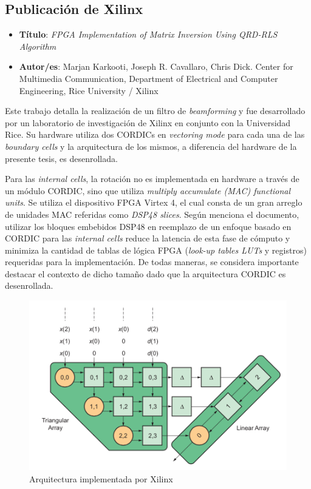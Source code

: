 \subsection{Publicación de Xilinx}

\begin{itemize}
\item[] \textbf{Título}: \textit{FPGA Implementation of Matrix Inversion Using QRD-RLS Algorithm} 
\item[] \textbf{Autor/es}: Marjan Karkooti, Joseph R. Cavallaro, Chris Dick. Center for Multimedia Communication, Department of Electrical and Computer Engineering, Rice University / Xilinx
\end{itemize}

Este trabajo \cite{XilinxQR} detalla la realización de un filtro de \textit{beamforming} y fue desarrollado por un laboratorio de investigación de Xilinx en conjunto con la Universidad Rice. Su hardware utiliza dos CORDICs en \textit{vectoring mode} para cada una de las \textit{boundary cells} y la arquitectura de los mismos, a diferencia del hardware de la presente tesis, es desenrollada.

Para las \textit{internal cells}, la rotación no es implementada en hardware a través de un módulo CORDIC, sino que utiliza \textit{multiply accumulate (MAC) functional units}. Se utiliza el dispositivo FPGA Virtex 4, el cual consta de un gran arreglo de unidades MAC referidas como \textit{DSP48 slices}. Según menciona el documento, utilizar los bloques embebidos DSP48 en reemplazo de un enfoque basado en CORDIC para las \textit{internal cells} reduce la latencia de esta fase de cómputo y minimiza la cantidad de tablas de lógica FPGA (\textit{look-up tables LUTs} y registros) requeridas para la implementación. De todas maneras, se considera importante destacar el contexto de dicho tamaño dado que la arquitectura CORDIC es desenrollada.

\begin{figure}[h!]
     \centering
     \includegraphics[width=12cm]{./figures/C03-xilinx_hardware}
     \caption{Arquitectura implementada por Xilinx}
     \label{fig:xilinx_hardware}
\end{figure}

